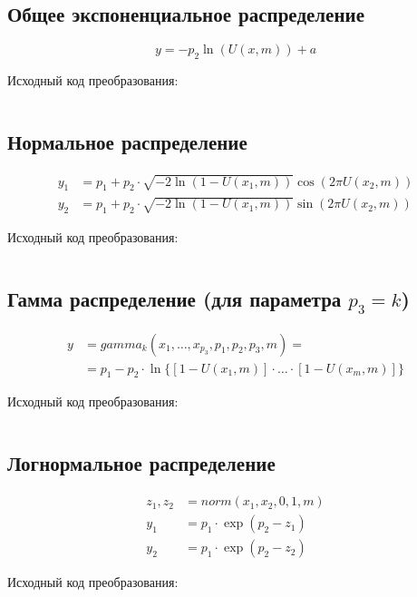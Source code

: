 \documentclass[spec, och, pract_otchet]{SCWorks}
\begin{document}
\subsection{Общее экспоненциальное распределение}

\begin{equation*}
  y = -p_2 \ln(U(x, m)) + a
\end{equation*}

Исходный код преобразования:
\inputminted{rust}{../rnc/src/exponential.rs}


\subsection{Нормальное распределение}

\begin{align*}
  y_1 &= p_1 + p_2 \cdot \sqrt{-2 \ln(1 - U(x_1, m))} \cos(2 \pi U(x_2, m)) \\
  y_2 &= p_1 + p_2 \cdot \sqrt{-2 \ln(1 - U(x_1, m))} \sin(2 \pi U(x_2, m))
\end{align*}

Исходный код преобразования:
\inputminted{rust}{../rnc/src/normal.rs}


\subsection{Гамма распределение (для параметра $p_3 = k$)}

\begin{align*}
  y &= gamma_k(x_1, \dots, x_{p_3}, p_1, p_2, p_3, m) =\\
    &= p_1 - p_2 \cdot \ln\{[1 - U(x_1, m)] \cdot \ldots \cdot [1 - U(x_m, m)]\}
\end{align*}

Исходный код преобразования:
\inputminted{rust}{../rnc/src/gamma.rs}


\subsection{Логнормальное распределение}

\begin{align*}
  z_1, z_2 &= norm(x_1, x_2, 0, 1, m) \\
  y_1 &= p_1 \cdot \exp(p_2 - z_1) \\ 
  y_2 &= p_1 \cdot \exp(p_2 - z_2)
\end{align*}

Исходный код преобразования:
\inputminted{rust}{../rnc/src/lognormal.rs}
\end{document}
